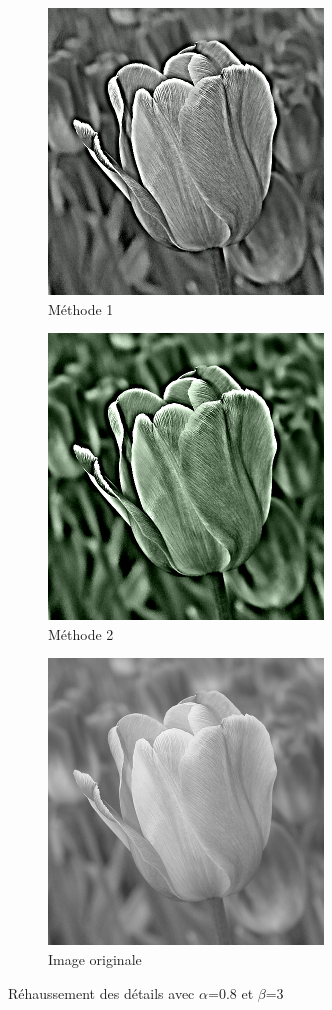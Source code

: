 \documentclass[twoside,UTF8]{EPURapport}
\begin{document}
\begin{figure}[H]
        \centering
        \begin{subfigure}[b]{0.3\textwidth}
                \includegraphics[scale=0.45]{images/flower1_08_3.png} 
                \caption{Méthode 1}
        \end{subfigure}
        \qquad \qquad
        \begin{subfigure}[b]{0.3\textwidth}
                \includegraphics[scale=0.45]{images/flower2_08_3.png}
                \caption{Méthode 2}
        \end{subfigure}
        
        \begin{subfigure}[b]{0.3\textwidth}
                \includegraphics[scale=0.45]{images/flower.png}
             	\caption{Image originale}
        \end{subfigure}
        \caption{Réhaussement des détails avec $\alpha$=0.8 et $\beta$=3 }
\end{figure}
\end{document}

